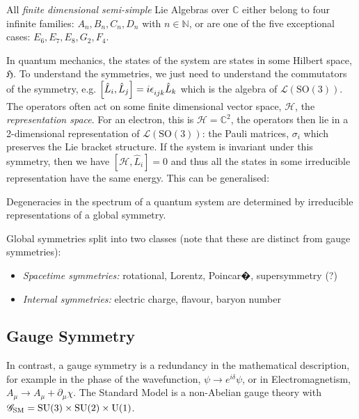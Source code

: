 \begin{definitionbox}
All \emph{finite dimensional semi-simple} Lie Algebras over $\mathbb{C}$ either belong to four infinite families: $A_n, B_n, C_n, D_n$ with $n \in \mathbb{N}$, or are one of the five exceptional cases: $E_6, E_7, E_8, G_2, F_4$.
\end{definitionbox}
In quantum mechanics, the states of the system are states in some Hilbert space, $\mathfrak{H}$. To understand the symmetries, we just need to understand the commutators of the symmetry, e.g. $\left[ \hat{L}_i , \hat{L}_j \right] = i\epsilon\indices{_{ijk}} \hat{L}_k$ which is the algebra of $\mathcal{L}\left(\textrm{SO}(3)\right)$. The operators often act on some finite dimensional vector space, $\mathcal{H}$, the \emph{representation space}. For an electron, this is $\mathcal{H} = \mathbb{C}^2$, the operators then lie in a 2-dimensional representation of $\mathcal{L}\left(\textrm{SO}(3)\right)$: the Pauli matrices, $\sigma_i$ which preserves the Lie bracket structure. If the system is invariant under this symmetry, then we have $\left[ \mathcal{H} , \hat{L}_i \right] = 0$ and thus all the states in some irreducible representation have the same energy. This can be generalised:
\begin{definitionbox}
Degeneracies in the spectrum of a quantum system are determined by irreducible representations of a global symmetry.
\end{definitionbox}
\noindent Global symmetries split into two classes (note that these are distinct from gauge symmetries):
\begin{itemize}
\item \emph{Spacetime symmetries:} rotational, Lorentz, Poincar�, supersymmetry (?)
\item \emph{Internal symmetries:} electric charge, flavour, baryon number
\end{itemize}

\subsection{Gauge Symmetry}

In contrast, a gauge symmetry is a redundancy in the mathematical description, for example in the phase of the wavefunction, $\psi \rightarrow e^{i\delta}\psi$, or in Electromagnetism, $A_{\mu} \rightarrow A_{\mu} + \partial_{\mu}\chi$. The Standard Model is a non-Abelian gauge theory with $\mathscr{G}_{\textrm{SM}}=\textrm{SU}(3) \times \textrm{SU}(2) \times \textrm{U(1)}$.
\newpage
